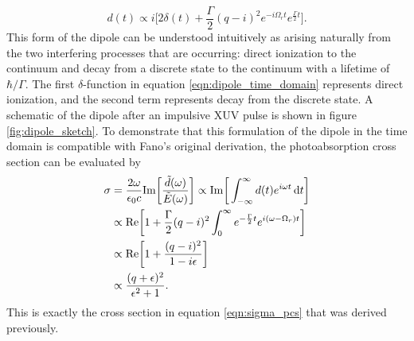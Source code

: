 \begin{equation}
\label{eqn:dipole_time_domain}
	d(t)\propto i\bigg[ 2\delta(t) + \frac{\Gamma}{2}(q-i)^2 e^{-i\Omega_r t}e^{\frac{\Gamma}{2}t} \bigg].
\end{equation}
This form of the dipole can be understood intuitively as arising naturally from the two interfering processes that are occurring: direct ionization to the continuum and decay from a discrete state to the continuum with a lifetime of $\hbar/\Gamma$.  The first $\delta$-function in equation \ref{eqn:dipole_time_domain} represents direct ionization, and the second term represents decay from the discrete state.  A schematic of the dipole after an impulsive XUV pulse is shown in  figure \ref{fig:dipole_sketch}.  To demonstrate that this formulation of the dipole in the time domain is compatible with Fano's original derivation, the photoabsorption cross section can be evaluated by
\begin{equation}
\begin{aligned}
	\sigma&=\frac{2\omega}{\epsilon_0 c}\mathrm{Im}\bigg[\frac{\tilde{d}(\omega)}{\tilde{E}(\omega)}\bigg]\propto \mathrm{Im}\bigg[\int_{-\infty}^{\infty} d(t) e^{i\omega t} \mathop{}\!\mathrm{d} t\bigg]\\
	&\propto\mathrm{Re}\bigg[1+\frac{\Gamma}{2}(q-i)^2\int_0^\infty e^{-\frac{\Gamma}{2}t}e^{i(\omega-\Omega_r)t}\bigg]\\
	&\propto\mathrm{Re}\bigg[1 + \frac{(q-i)^2}{1-i\epsilon}\bigg]\\
	& \propto \frac{(q+\epsilon)^2}{\epsilon^2 +1}.
\end{aligned}
\end{equation}
This is exactly the cross section in equation \ref{eqn:sigma_pcs} that was derived previously.

